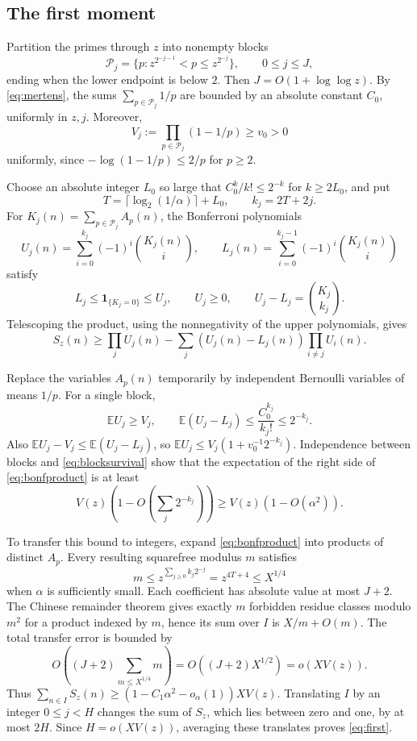 \documentclass[11pt,reqno]{amsart}
\theoremstyle{remark}
\numberwithin{equation}{section}
\newcommand{\E}{\mathbb E}
\newcommand{\ind}{\mathbf 1}
\begin{document}
\subsection{The first moment}

Partition the primes through $z$ into nonempty blocks
\[
 \mathcal P_j=\{p:z^{2^{-j-1}}<p\leq z^{2^{-j}}\},
 \qquad 0\leq j\leq J,
\]
ending when the lower endpoint is below $2$.
Then $J=O(1+\log\log z)$.
By \eqref{eq:mertens}, the sums $\sum_{p\in\mathcal P_j}1/p$
are bounded by an absolute constant $C_0$, uniformly in $z,j$.
Moreover,
\begin{equation}\label{eq:blocksurvival}
 V_j:=\prod_{p\in\mathcal P_j}(1-1/p)\geq v_0>0
\end{equation}
uniformly, since $-\log(1-1/p)\leq2/p$ for $p\geq2$.

Choose an absolute integer $L_0$ so large that
$C_0^k/k!\leq2^{-k}$ for $k\geq2L_0$, and put
\[
 T=\lceil\log_2(1/\alpha)\rceil+L_0,\qquad k_j=2T+2j.
\]
For $K_j(n)=\sum_{p\in\mathcal P_j}A_p(n)$, the Bonferroni
polynomials
\[
 U_j(n)=\sum_{i=0}^{k_j}(-1)^i\binom{K_j(n)}i,
 \qquad
 L_j(n)=\sum_{i=0}^{k_j-1}(-1)^i\binom{K_j(n)}i
\]
satisfy
\[
 L_j\leq\ind_{\{K_j=0\}}\leq U_j,
 \qquad U_j\geq0,\qquad U_j-L_j=\binom{K_j}{k_j}.
\]
Telescoping the product, using the nonnegativity of the upper
polynomials, gives
\begin{equation}\label{eq:bonfproduct}
 S_z(n)\geq\prod_jU_j(n)
 -\sum_j(U_j(n)-L_j(n))\prod_{i\ne j}U_i(n).
\end{equation}

Replace the variables $A_p(n)$ temporarily by independent Bernoulli
variables of means $1/p$. For a single block,
\[
 \E U_j\geq V_j,\qquad
 \E(U_j-L_j)\leq\frac{C_0^{k_j}}{k_j!}\leq2^{-k_j}.
\]
Also $\E U_j-V_j\leq\E(U_j-L_j)$, so
$\E U_j\leq V_j(1+v_0^{-1}2^{-k_j})$.
Independence between blocks and \eqref{eq:blocksurvival} show that
the expectation of the right side of \eqref{eq:bonfproduct} is at least
\[
 V(z)\left(1-O\left(\sum_j2^{-k_j}\right)\right)
 \geq V(z)(1-O(\alpha^2)).
\]

To transfer this bound to integers, expand \eqref{eq:bonfproduct}
into products of distinct $A_p$.
Every resulting squarefree modulus $m$ satisfies
\[
 m\leq z^{\sum_{j\geq0}k_j2^{-j}}
 =z^{4T+4}\leq X^{1/4}
\]
when $\alpha$ is sufficiently small.
Each coefficient has absolute value at most $J+2$.
The Chinese remainder theorem gives exactly $m$ forbidden residue
classes modulo $m^2$ for a product indexed by $m$, hence its sum
over $I$ is $X/m+O(m)$.
The total transfer error is bounded by
\[
 O\left((J+2)\sum_{m\leq X^{1/4}}m\right)
 =O((J+2)X^{1/2})=o(XV(z)).
\]
Thus $\sum_{n\in I}S_z(n)\geq(1-C_1\alpha^2-o_\alpha(1))XV(z)$.
Translating $I$ by an integer $0\leq j<H$ changes the sum of
$S_z$, which lies between zero and one, by at most $2H$.
Since $H=o(XV(z))$, averaging these translates proves
\eqref{eq:first}.
\end{document}
